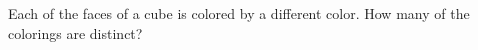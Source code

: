 Each of the faces of a cube is colored by a different color. How many of the colorings are distinct?
